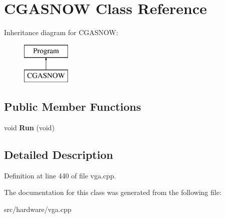 \hypertarget{classCGASNOW}{\section{C\-G\-A\-S\-N\-O\-W Class Reference}
\label{classCGASNOW}
}
Inheritance diagram for C\-G\-A\-S\-N\-O\-W\-:\begin{figure}[H]
\begin{center}
\leavevmode
\includegraphics[height=2.000000cm]{classCGASNOW}
\end{center}
\end{figure}
\subsection*{Public Member Functions}
\begin{DoxyCompactItemize}
\item 
\hypertarget{classCGASNOW_a756619df2231c00d48df4bfec4a8965b}{void {\bfseries Run} (void)}\label{classCGASNOW_a756619df2231c00d48df4bfec4a8965b}

\end{DoxyCompactItemize}


\subsection{Detailed Description}


Definition at line 440 of file vga.\-cpp.



The documentation for this class was generated from the following file\-:\begin{DoxyCompactItemize}
\item 
src/hardware/vga.\-cpp\end{DoxyCompactItemize}
